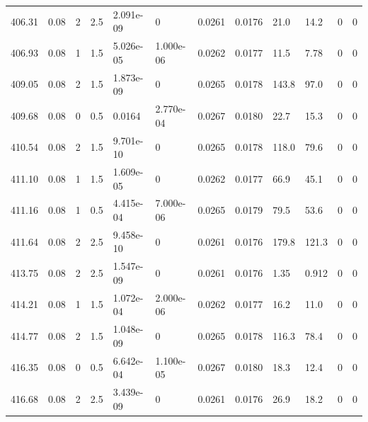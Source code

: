 \documentclass[preview]{standalone}
\begin{document}
{{{{{{{\begin{tabular}{L{1.2cm}C{1.2cm} C{0.3cm}C{0.5cm} C{1.4cm}C{1.4cm} C{1.4cm}C{1.4cm} C{1.6cm}C{1.6cm} C{1.6cm}C{1.6cm}}
  406.31  &  0.08  & 2     & 2.5 &  2.091e-09  & 0  &  0.0261&   0.0176& 21.0 & 14.2   &  0 & 0  \\ 
  406.93  &  0.08  & 1     & 1.5 &  5.026e-05  & 1.000e-06  &  0.0262&   0.0177& 11.5 & 7.78   &  0 & 0  \\ 
  409.05  &  0.08  & 2     & 1.5 &  1.873e-09  & 0  &  0.0265&   0.0178& 143.8 & 97.0   &  0 & 0  \\ 
  409.68  &  0.08  & 0     & 0.5 &  0.0164  & 2.770e-04  &  0.0267&   0.0180& 22.7 & 15.3   &  0 & 0  \\ 
  410.54  &  0.08  & 2     & 1.5 &  9.701e-10  & 0  &  0.0265&   0.0178& 118.0 & 79.6   &  0 & 0  \\ 
  411.10  &  0.08  & 1     & 1.5 &  1.609e-05  & 0  &  0.0262&   0.0177& 66.9 & 45.1   &  0 & 0  \\ 
  411.16  &  0.08  & 1     & 0.5 &  4.415e-04  & 7.000e-06  &  0.0265&   0.0179& 79.5 & 53.6   &  0 & 0  \\ 
  411.64  &  0.08  & 2     & 2.5 &  9.458e-10  & 0  &  0.0261&   0.0176& 179.8 & 121.3   &  0 & 0  \\ 
  413.75  &  0.08  & 2     & 2.5 &  1.547e-09  & 0  &  0.0261&   0.0176& 1.35 & 0.912   &  0 & 0  \\ 
  414.21  &  0.08  & 1     & 1.5 &  1.072e-04  & 2.000e-06  &  0.0262&   0.0177& 16.2 & 11.0   &  0 & 0  \\ 
  414.77  &  0.08  & 2     & 1.5 &  1.048e-09  & 0  &  0.0265&   0.0178& 116.3 & 78.4   &  0 & 0  \\ 
  416.35  &  0.08  & 0     & 0.5 &  6.642e-04  & 1.100e-05  &  0.0267&   0.0180& 18.3 & 12.4   &  0 & 0  \\ 
  416.68  &  0.08  & 2     & 2.5 &  3.439e-09  & 0  &  0.0261&   0.0176& 26.9 & 18.2   &  0 & 0  \\ 
\hline 
\end{tabular} 

}}}}}}}
\end{document}
